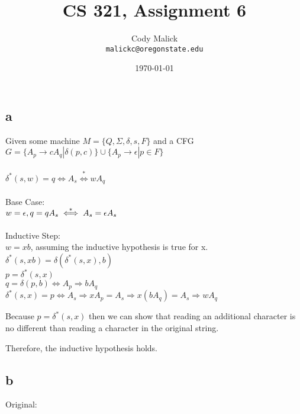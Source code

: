 \documentclass[10pt,letterpaper]{article}
\begin{document}
  \title{CS 321, Assignment 6}
  \author{Cody Malick\\
  \texttt{malickc@oregonstate.edu}}
  \date{\today}
  \maketitle

\section{}
\subsection*{a}
Given some machine $M=\{Q,\Sigma,\delta,s,F\}$ and a CFG 
$G=\{A_p \rightarrow cA_q | \delta(p,c)\} 
\cup \{A_p \rightarrow \epsilon | p \in F\}$\\\\

$\delta^*(s,w) = q \iff A_s \overset{*}{\iff} wA_q$\\\\

\noindent Base Case:\\
$w=\epsilon, q=q\\
A_s \overset{*}{\iff} A_s = \epsilon A_s$\\\\

\noindent Inductive Step:\\
$w = xb$, assuming the inductive hypothesis is true for x.\\
$\delta^*(s,xb)=\delta(\delta^*(s,x),b)$\\
$p=\delta^*(s,x)$\\
$q=\delta(p,b) \iff A_p \Rightarrow bA_q$\\
$\delta^*(s,x) = p \iff A_s \Rightarrow xA_p=A_s \Rightarrow x(bA_q) = A_s \Rightarrow wA_q$

Because $p = \delta^*(s,x)$ then we can show that reading an additional
character is no different than reading a character in the original string.

Therefore, the inductive hypothesis holds. 

\subsection*{b}
Original: \\
\end{document}
